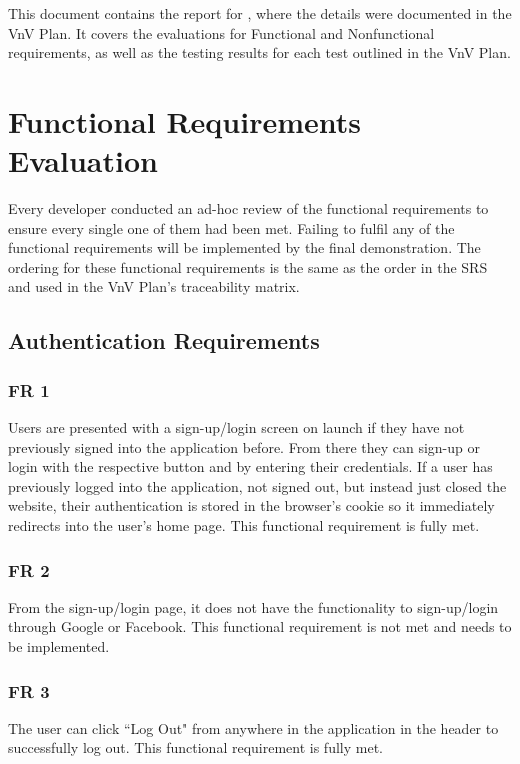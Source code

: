 \documentclass[12pt, titlepage]{article}
\begin{document}
\newpage

\tableofcontents

\listoftables %

\listoffigures %

\newpage


This document contains the report for \progname , where the details were documented in the VnV Plan. It covers the evaluations for Functional and Nonfunctional requirements, as well as the testing results for each test outlined in the VnV Plan.

\section{Functional Requirements Evaluation}
Every developer conducted an ad-hoc review of the functional requirements to ensure every single one of them had been met. Failing to fulfil any of the functional requirements will be implemented by the final demonstration. The ordering for these functional requirements is the same as the order in the SRS and used in the VnV Plan's traceability matrix.

\subsection{Authentication Requirements}
\subsubsection{FR 1}
Users are presented with a sign-up/login screen on launch if they have not previously signed into the application before. From there they can sign-up or login with the respective button and by entering their credentials. If a user has previously logged into the application, not signed out, but instead just closed the website, their authentication is stored in the browser's cookie so it immediately redirects into the user's home page. This functional requirement is fully met.

\subsubsection{FR 2}
From the sign-up/login page, it does not have the functionality to sign-up/login through Google or Facebook. This functional requirement is not met and needs to be implemented.

\subsubsection{FR 3}
The user can click ``Log Out" from anywhere in the application in the header to successfully log out. This functional requirement is fully met.
\end{document}
